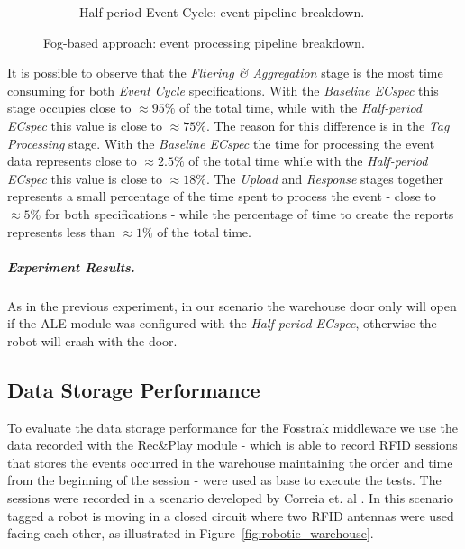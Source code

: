 \begin{figure}[ht!]
\begin{subfigure}{.5\textwidth}
            \caption{Half-period Event Cycle: event pipeline breakdown.}
            \label{fig:ecspec_effective_half}
          \end{subfigure}
          \caption[Fog-based approach: event processing breakdown.]{Fog-based approach: event processing pipeline breakdown.}
          \label{fig:ecspec_effective_breakdown}
        \end{figure}

        It is possible to observe that the \textit{Fltering \& Aggregation} stage is the most time consuming
        for both \textit{Event Cycle} specifications. With the \textit{Baseline ECspec} this stage occupies
        close to $\approx95\%$ of the total time, while with the \textit{Half-period ECspec} this value is
        close to $\approx75\%$. The reason for this difference is in the \textit{Tag Processing} stage.
        With the \textit{Baseline ECspec} the time for processing the event data represents close to $\approx2.5\%$
        of the total time while with the \textit{Half-period ECspec} this value is close to $\approx18\%$.
        The \textit{Upload} and \textit{Response} stages together represents a small percentage of
        the time spent to process the event - close to $\approx5\%$ for both specifications - while the percentage
        of time to create the reports represents less than $\approx1\%$ of the total time.

        \subparagraph{Experiment Results.}
        \label{subp:fog_experiment_result}
        As in the previous experiment, in our scenario the warehouse door only will open if the \gls{ALE}
        module was configured with the \textit{Half-period ECspec}, otherwise the robot will crash with
        the door.

        \subsection{Data Storage Performance}
        \label{sub:eval_exp_data}
        To evaluate the data storage performance for the Fosstrak middleware we use the data recorded with the Rec\&Play
        module - which is able to record \gls{RFID} sessions that stores the events occurred in the warehouse
        maintaining the order and time from the beginning of the session - were used as base to execute
        the tests. The sessions were recorded in a scenario developed by Correia et. al \cite{Correia:Thesis:2014}.
        In this scenario tagged a robot is moving in a closed circuit where two \gls{RFID} antennas were used
        facing each other, as illustrated in Figure~\ref{fig:robotic_warehouse}.\\

